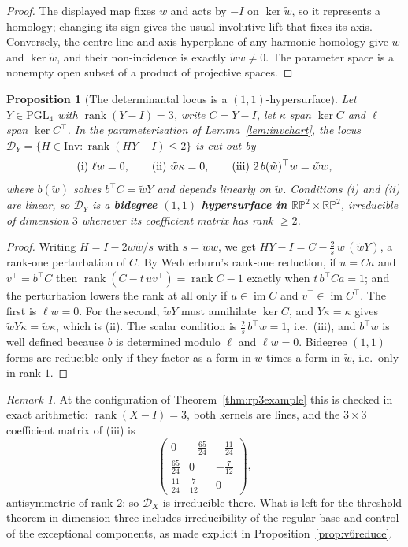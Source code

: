 \documentclass[11pt,a4paper]{article}
\theoremstyle{plain}
\newtheorem{proposition}[theorem]{Proposition}
\theoremstyle{definition}
\theoremstyle{remark}
\newtheorem{remark}[theorem]{Remark}
\newcommand{\RP}{\mathbb{RP}}
\newcommand{\PGL}{\mathrm{PGL}}
\newcommand{\rk}{\operatorname{rank}}
\begin{document}
\begin{proof}
The displayed map fixes $w$ and acts by $-I$ on $\ker\tilde w$, so it represents
a homology; changing its sign gives the usual involutive lift that fixes its
axis. Conversely, the centre line and axis hyperplane of any harmonic homology
give $w$ and $\ker\tilde w$, and their non-incidence is exactly $\tilde w w\ne0$.
The parameter space is a nonempty open subset of a product of projective spaces.
\end{proof}

\begin{proposition}[The determinantal locus is a $(1,1)$-hypersurface]\label{prop:11hyp}
Let $Y\in\PGL_4$ with $\rk(Y-I)=3$, write $C=Y-I$, let $\kappa$ span $\ker C$ and
$\ell$ span $\ker C^\top$. In the parameterisation of
Lemma~\ref{lem:invchart}, the locus
$\mathcal D_Y=\{H\in\mathrm{Inv}:\rk(HY-I)\le2\}$ is cut out by
\[
  \textup{(i)}\ \ell w=0,\qquad
  \textup{(ii)}\ \tilde w\kappa=0,\qquad
  \textup{(iii)}\ 2\,b(\tilde w)^\top w=\tilde ww,
\]
where $b(\tilde w)$ solves $b^\top C=\tilde wY$ and depends linearly on $\tilde w$.
Conditions \textup{(i)} and \textup{(ii)} are linear, so $\mathcal D_Y$ is a
\textbf{bidegree $(1,1)$ hypersurface in $\RP^2\times\RP^2$}, irreducible of
dimension $3$ whenever its coefficient matrix has rank $\ge2$.
\end{proposition}

\begin{proof}
Writing $H=I-2w\tilde w/s$ with $s=\tilde ww$, we get
$HY-I=C-\tfrac2s\,w\,(\tilde wY)$, a rank-one perturbation of $C$. By Wedderburn's
rank-one reduction, if $u=Ca$ and $v^\top=b^\top C$ then $\rk(C-t\,uv^\top)=\rk C-1$
exactly when $t\,b^\top Ca=1$; and the perturbation lowers the rank at all only if
$u\in\operatorname{im}C$ and $v^\top\in\operatorname{im}C^\top$. The first is
$\ell w=0$. For the second, $\tilde wY$ must annihilate $\ker C$, and
$Y\kappa=\kappa$ gives $\tilde wY\kappa=\tilde w\kappa$, which is (ii). The scalar
condition is $\tfrac2s\,b^\top w=1$, i.e.\ (iii), and $b^\top w$ is well defined
because $b$ is determined modulo $\ell$ and $\ell w=0$. Bidegree $(1,1)$ forms are
reducible only if they factor as a form in $w$ times a form in $\tilde w$, i.e.\ only
in rank $1$.
\end{proof}

\begin{remark}
At the configuration of Theorem~\ref{thm:rp3example} this is checked in exact
arithmetic: $\rk(X-I)=3$, both kernels are lines, and the $3\times3$ coefficient
matrix of \textup{(iii)} is
\[
  \begin{pmatrix}0&-\tfrac{65}{24}&-\tfrac{11}{24}\\
  \tfrac{65}{24}&0&-\tfrac7{12}\\ \tfrac{11}{24}&\tfrac7{12}&0\end{pmatrix},
\]
antisymmetric of rank $2$: so $\mathcal D_X$ is irreducible there. What is left for
the threshold theorem in dimension three includes irreducibility of the
regular base and control of the exceptional components, as made explicit
in Proposition~\ref{prop:v6reduce}.
\end{remark}
\end{document}
